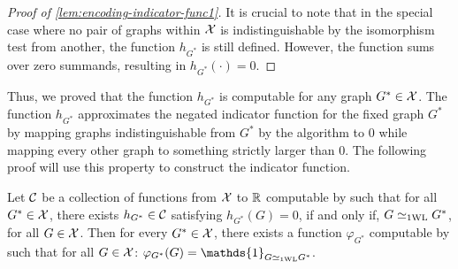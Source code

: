 \begin{proof}[Proof of \cref{lem:encoding-indicator-func1}]
    It is crucial to note that in the special case where no pair of graphs within  $\mathcal{X}$ is indistinguishable by the \wl isomorphism test from another, the function $h_{G^*}$ is still defined. However, the function sums over zero summands, resulting in $h_{G^*}(\cdot) = 0$.
\end{proof}

Thus, we proved that the function $h_{G^*}$ is \wlnn computable for any graph $G^* \in \mathcal{X}$. The function $h_{G^*}$ approximates the negated indicator function for the fixed graph $G^*$ by mapping graphs indistinguishable from $G^*$ by the \wl algorithm to $0$ while mapping every other graph to something strictly larger than $0$. The following proof will use this property to construct the indicator function.

\begin{lemma}\label{lem:encoding-indicator-func2}
    Let $\mathcal{C}$ be a collection of functions from $\mathcal{X}$ to $\mathbb{R}$ computable by \wlnn such that for all $G^* \in \mathcal{X}$, there exists $h_{G^*} \in \mathcal{C}$ satisfying $h_{G^*}(G) = 0 $, if and only if, $G \simeq_{\text{1WL}} G^*$, for all $G \in \mathcal{X}$. Then for every $G^* \in \mathcal{X}$, there exists a function $\varphi_{G^*} $ computable by \wlnn such that for all $G \in \mathcal{X}$: $\varphi_{G^*}(G) = \mathds{1}_{G \wliso G^*}$.
\end{lemma}

